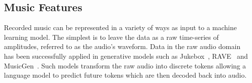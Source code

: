 





\subsection{Music Features}\label{sec:background-features}

Recorded music can be represented in a variety of ways as input to a machine learning model. The simplest is to leave the data as a raw time-series of amplitudes, referred to as the audio's waveform. Data in the raw audio domain has been successfully applied in generative models such as Jukebox~\citep{Jukebox}, RAVE~\citep{RAVE} and MusicGen~\citep{MusicGen}. Such models transform the raw audio into discrete tokens allowing a language model to predict future tokens which are then decoded back into audio.

